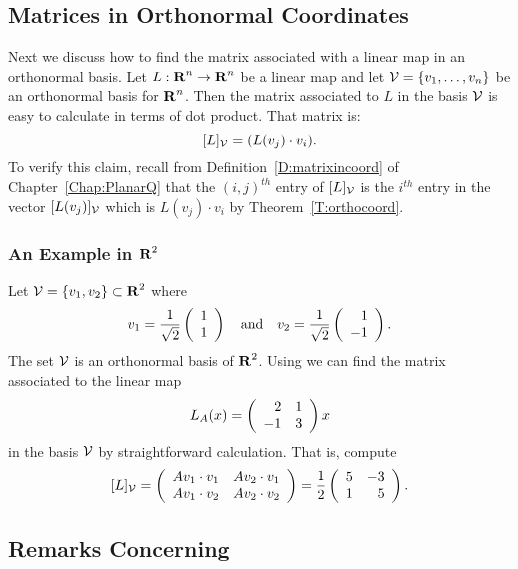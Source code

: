 \subsection*{Matrices in Orthonormal Coordinates}

Next we discuss how to find the matrix associated with a linear map in an
orthonormal basis.  Let $L:\mbox{$\bf{R}$}^n\to\mbox{$\bf{R}$}^n$ be a linear map and let
${\cal V} = \{v_1,\ldots,v_n\}$ be an orthonormal basis for $\mbox{$\bf{R}$}^n$.  Then
the matrix associated to $L$ in the basis ${\cal V}$ is easy to calculate
in terms of dot product.  That matrix is:
\begin{equation}  \label{e:coordorthomat}
[L]_{\cal V} = (L(v_j)\cdot v_i).
\end{equation}
To verify this claim, recall from Definition~\ref{D:matrixincoord} of
Chapter~\ref{Chap:PlanarQ} that the $(i,j)^{th}$ entry of $[L]_{\cal V}$ is
the $i^{th}$ entry in the vector $[L(v_j)]_{\cal V}$ which is
$L(v_j)\cdot v_i$ by Theorem~\ref{T:orthocoord}.

\subsubsection{An Example in $\mbox{$\bf{R}$}^2$}

Let ${\cal V}=\{v_1,v_2\}\subset\mbox{$\bf{R}$}^2$ where
\[
v_1=\frac{1}{\sqrt{2}}\left(\begin{array}{r} 1 \\ 1\end{array}\right) \quad\mbox{and}\quad
v_2=\frac{1}{\sqrt{2}}\left(\begin{array}{r} 1 \\ -1\end{array}\right).
\]
The set ${\cal V}$ is an orthonormal basis of $\mbox{$\bf{R}$}^2$.  Using
 we can find the matrix associated to the linear map
\[
L_A(x) = \left(\begin{array}{rr} 2 & 1\\ -1 &3\end{array}\right)x
\]
in the basis ${\cal V}$ by straightforward calculation.  That is, compute
\[
[L]_{\cal V} =
\left(\begin{array}{rr} Av_1\cdot v_1 & Av_2\cdot v_1\\ Av_1\cdot v_2 &Av_2\cdot v_2\end{array}\right)
=\frac{1}{2}\left(\begin{array}{rr} 5 & -3\\ 1 &5\end{array}\right).
\]

\subsection*{Remarks Concerning \Matlab}

